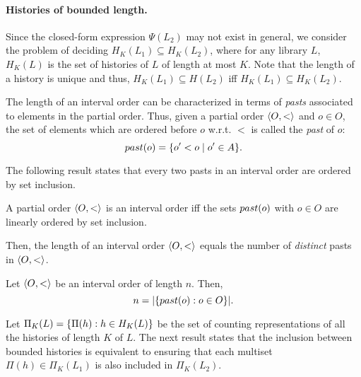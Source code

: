 \paragraph{Histories of bounded length.}
Since the closed-form expression $\Psi(L_2)$ may not exist in general, we consider the problem of deciding
$H_K(L_1) \subseteq H_K(L_2)$, where for any library $L$, $H_K(L)$ is the set of histories of $L$ of length at most $K$.
Note that the length of a history is unique and thus, $H_K(L_1) \subseteq H(L_2)$ iff $H_K(L_1) \subseteq H_K(L_2)$.

The length of an interval order can be characterized 
in terms of \emph{pasts} %
associated to elements in the partial order.
Thus, given a partial order $\left\langle {O,<} \right\rangle$ and $o\in O$, the set of elements which
are ordered before $o$ w.r.t. $<$ is called the \emph{past} of $o$:
\[
\past{o}=\{o' < o\mid o'\in A\}.%
\]


The following result states that every two pasts %
in an interval
order are ordered by set inclusion.

\begin{lemma}

  A partial order $\left\langle {O,<} \right\rangle$ is an interval order iff the sets $past({o})$ with $o\in O$ %
  are linearly ordered by set inclusion. 

\end{lemma}

Then, the length of an interval order $\left\langle {O,<} \right\rangle$ equals the number of \emph{distinct} pasts in $\left\langle {O,<} \right\rangle$. 

\begin{lemma}\label{lemma:len}
Let $\left\langle {O,<} \right\rangle$ be an interval order of length $n$. Then,
\[
n=|\set{\past{o}:o\in O}|. %
\]
\end{lemma}

Let $\Pi_K(L)={\{ \Pi(h):h\in H_K(L) \}}$ be the set of counting representations of all the histories of length $K$ of $L$.
The next result states that the inclusion between bounded histories is equivalent to ensuring that each multiset 
$\Pi(h) \in \Pi_K(L_1)$ is also included in $\Pi_K(L_2)$.

